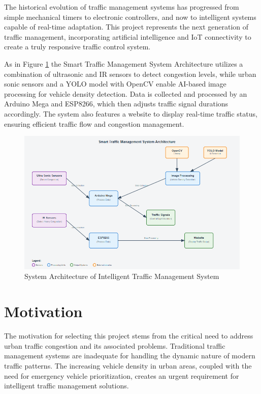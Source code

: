 \documentclass[12pt]{report}
\begin{document}
The historical evolution of traffic management systems has progressed from simple mechanical timers to electronic controllers, and now to intelligent systems capable of real-time adaptation. This project represents the next generation of traffic management, incorporating artificial intelligence and IoT connectivity to create a truly responsive traffic control system.

As in Figure \ref{fig:system_architecture} the Smart Traffic Management System Architecture utilizes a combination of ultrasonic and IR sensors to detect congestion levels, while urban sonic sensors and a YOLO model with OpenCV enable AI-based image processing for vehicle density detection. Data is collected and processed by an Arduino Mega and ESP8266, which then adjusts traffic signal durations accordingly. The system also features a website to display real-time traffic status, ensuring efficient traffic flow and congestion management. 
\begin{figure}[htb]
\centering
	\includegraphics[scale=1]{Figures/system_architecture.png}	
	\caption{System Architecture of Intelligent Traffic Management System}
	\label{fig:system_architecture}
\end{figure}

\section[Motivation]{\textbf{Motivation}}

The motivation for selecting this project stems from the critical need to address urban traffic congestion and its associated problems. Traditional traffic management systems are inadequate for handling the dynamic nature of modern traffic patterns. The increasing vehicle density in urban areas, coupled with the need for emergency vehicle prioritization, creates an urgent requirement for intelligent traffic management solutions.
\end{document}
